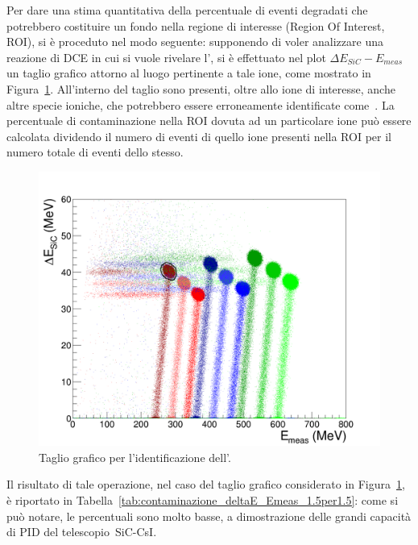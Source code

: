 Per dare una stima quantitativa della percentuale di eventi degradati che potrebbero costituire un fondo nella regione di interesse (Region Of Interest, ROI), si è proceduto nel modo seguente: supponendo di voler analizzare una reazione di DCE in cui si vuole rivelare l', si è effettuato nel plot $\Delta E_{SiC} - E_{meas}$ un taglio grafico attorno al luogo pertinente a tale ione, come mostrato in Figura~\ref{fig:deltaE_Emeas_taglio}.
All'interno del taglio sono presenti, oltre allo ione di interesse, anche altre specie ioniche, che potrebbero essere erroneamente identificate come~.
La percentuale di contaminazione nella ROI dovuta ad un particolare ione può essere calcolata dividendo il numero di eventi di quello ione presenti nella ROI per il numero totale di eventi dello stesso.
\begin{figure} [!t]
	\centering
	\includegraphics[width=\textwidth, keepaspectratio]{Grafici_Tesi2/PID/deltaE_Emeas_quadrata_taglio.png}
	\caption{Taglio grafico per l'identificazione dell'.} \label{fig:deltaE_Emeas_taglio}
\end{figure}
Il risultato di tale operazione, nel caso del taglio grafico considerato in Figura~\ref{fig:deltaE_Emeas_taglio}, è riportato in Tabella~\ref{tab:contaminazione_deltaE_Emeas_1.5per1.5}: come si può notare, le percentuali sono molto basse, a dimostrazione delle grandi capacità di PID del telescopio~SiC-CsI.
